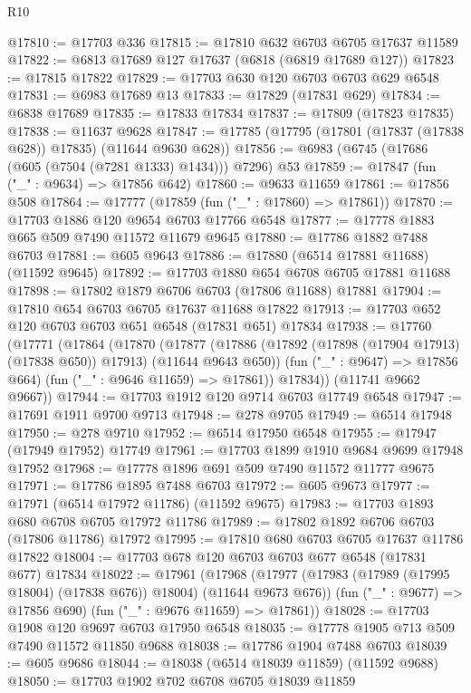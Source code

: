 \begin{lexlean}{R10}
\begin{coremodule}
{{{{{{{{{{{{{{{{{{{{{{{{{{{{{{{{{{{{{{{{{{{{{{{{{{{{{{{{{{{{{{{{{{{{{{{{{{{{{{{{{{{{@17810 := @17703 @336
@17815 := @17810 @632 @6703 @6705 @17637 @11589
@17822 := @6813 @17689 @127 @17637 (@6818 (@6819 @17689 @127))
@17823 := @17815 @17822
@17829 := @17703 @630 @120 @6703 @6703 @629 @6548
@17831 := @6983 @17689 @13
@17833 := @17829 (@17831 @629)
@17834 := @6838 @17689
@17835 := @17833 @17834
@17837 := @17809 (@17823 @17835)
@17838 := @11637 @9628
@17847 := @17785 (@17795 (@17801 (@17837 (@17838 @628)) @17835) (@11644 @9630 @628))
@17856 := @6983 (@6745 (@17686 (@605 (@7504 (@7281 @1333) @1434))) @7296) @53
@17859 := @17847 (fun ("_" : @9634) => @17856 @642)
@17860 := @9633 @11659
@17861 := @17856 @508
@17864 := @17777 (@17859 (fun ("_" : @17860) => @17861))
@17870 := @17703 @1886 @120 @9654 @6703 @17766 @6548
@17877 := @17778 @1883 @665 @509 @7490 @11572 @11679 @9645
@17880 := @17786 @1882 @7488 @6703
@17881 := @605 @9643
@17886 := @17880 (@6514 @17881 @11688) (@11592 @9645)
@17892 := @17703 @1880 @654 @6708 @6705 @17881 @11688
@17898 := @17802 @1879 @6706 @6703 (@17806 @11688) @17881
@17904 := @17810 @654 @6703 @6705 @17637 @11688 @17822
@17913 := @17703 @652 @120 @6703 @6703 @651 @6548 (@17831 @651) @17834
@17938 := @17760
    (@17771
      (@17864
        (@17870
          (@17877
            (@17886 (@17892 (@17898 (@17904 @17913) (@17838 @650)) @17913) (@11644 @9643 @650))
            (fun ("_" : @9647) => @17856 @664)
            (fun ("_" : @9646 @11659) => @17861))
          @17834))
      (@11741 @9662 @9667))
@17944 := @17703 @1912 @120 @9714 @6703 @17749 @6548
@17947 := @17691 @1911 @9700 @9713
@17948 := @278 @9705
@17949 := @6514 @17948
@17950 := @278 @9710
@17952 := @6514 @17950 @6548
@17955 := @17947 (@17949 @17952) @17749
@17961 := @17703 @1899 @1910 @9684 @9699 @17948 @17952
@17968 := @17778 @1896 @691 @509 @7490 @11572 @11777 @9675
@17971 := @17786 @1895 @7488 @6703
@17972 := @605 @9673
@17977 := @17971 (@6514 @17972 @11786) (@11592 @9675)
@17983 := @17703 @1893 @680 @6708 @6705 @17972 @11786
@17989 := @17802 @1892 @6706 @6703 (@17806 @11786) @17972
@17995 := @17810 @680 @6703 @6705 @17637 @11786 @17822
@18004 := @17703 @678 @120 @6703 @6703 @677 @6548 (@17831 @677) @17834
@18022 := @17961
    (@17968
      (@17977 (@17983 (@17989 (@17995 @18004) (@17838 @676)) @18004) (@11644 @9673 @676))
      (fun ("_" : @9677) => @17856 @690)
      (fun ("_" : @9676 @11659) => @17861))
@18028 := @17703 @1908 @120 @9697 @6703 @17950 @6548
@18035 := @17778 @1905 @713 @509 @7490 @11572 @11850 @9688
@18038 := @17786 @1904 @7488 @6703
@18039 := @605 @9686
@18044 := @18038 (@6514 @18039 @11859) (@11592 @9688)
@18050 := @17703 @1902 @702 @6708 @6705 @18039 @11859
}}}}}}}}}}}}}}}}}}}}}}}}}}}}}}}}}}}}}}}}}}}}}}}}}}}}}}}}}}}}}}}}}}}}}}}}}}}}}}}}}}}}
\end{coremodule}
\end{lexlean}

